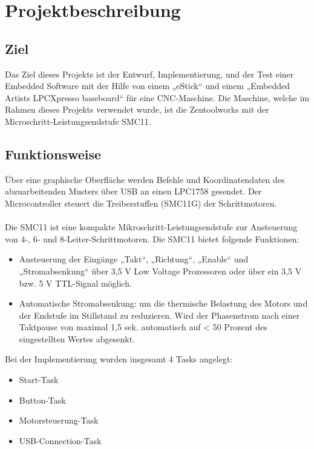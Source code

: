 \documentclass[11pt,a4paper,bibtotoc,oneside]{scrbook}
\begin{document}
\tableofcontents\thispagestyle{empty}
\newpage

\setcounter{page}{1}
\chapter{Projektbeschreibung}

\section{Ziel}
Das Ziel dieses Projekts ist der Entwurf, Implementierung, und der Test einer Embedded Software mit der Hilfe von einem „eStick“  und einem „Embedded Artists LPCXpresso baseboard“ für eine CNC-Maschine. Die Maschine, welche im Rahmen dieses Projekts verwendet wurde, ist die Zentoolworks mit der Microschritt-Leistungsendstufe SMC11.

\section{Funktionsweise}
Über eine graphische Oberfläche werden Befehle und Koordinatendaten des abzuarbeitenden Musters über USB an einen LPC1758 gesendet. Der Microcontroller steuert die Treiberstuffen (SMC11G) der Schrittmotoren.\\\\
Die SMC11 ist eine kompakte Mikroschritt-Leistungsendstufe zur Ansteuerung von 4-, 6- und 8-Leiter-Schrittmotoren.  
Die SMC11 bietet folgende Funktionen: 

\begin{itemize}
\item Ansteuerung der Eingänge „Takt“, „Richtung“, „Enable“ und „Stromabsenkung“ 
über 3,5 V Low Voltage Prozessoren oder über ein 3,5 V bzw. 5 V TTL-Signal 
möglich. 
\item Automatische Stromabsenkung: um die thermische Belastung des 
Motors und der Endstufe im Stillstand zu reduzieren. Wird der Phasenstrom nach
einer Taktpause von maximal 1,5 sek. automatisch auf < 50 Prozent des  eingestellten Wertes abgesenkt. 
\end{itemize}
Bei der Implementierung wurden insgesamt 4 Tasks angelegt:
\begin{itemize}
\item Start-Task
\item Button-Task
\item Motorsteuerung-Task
\item USB-Connection-Task

\end{itemize}
\end{document}
